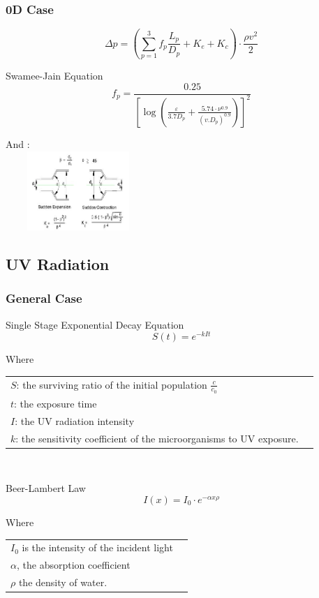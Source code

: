 \documentclass[xcolor=dvipsnames,10pt]{beamer}
\begin{document}
\begin{frame}
\frametitle{0D Case}
	\begin{equation}
		\Delta p = \left(\sum_{p=1}^3 f_p\frac{L_p}{D_p} + K_e + K_c\right)\cdot \frac{\rho v^2}{2}
	\end{equation}
\begin{block}{Swamee-Jain Equation}
\begin{equation}
	f_p = \frac{0.25}{[\log (\frac{\varepsilon}{3.7 D_p} + \frac{5.74\cdot \nu^{0.9}}{(v.D_p)^{0.9}})]^2}
\end{equation}
\end{block}
And : \\
\hspace{20mm}
\includegraphics[height=30mm, width=5.5cm]{./images/fitting.JPG}
\end{frame}





\subsection{UV Radiation}

\begin{frame}
	\frametitle{General Case}
	\begin{block}{Single Stage Exponential Decay Equation}
		\begin{equation}
			S(t)=e^{-kIt}
		\end{equation}
	\end{block}
	Where 
		{\footnotesize 
		\begin{tabular}{ll}
			$S$: the surviving ratio of the initial population $\frac{c}{c_0}$\\
			$t$: the exposure time\\
			$I$: the UV radiation intensity\\
			$k$: the sensitivity coefficient of the microorganisms to UV exposure.
		\end{tabular}
		} \\


	\begin{block}{Beer-Lambert Law}
		\begin{equation}
			I(x) = I_0\cdot e^{-\alpha x\rho}
		\end{equation}
	\end{block}
	Where 
		{\footnotesize 
			\begin{tabular}{ll}
			$I_0$ is the intensity of the incident light\\
			$\alpha$, the absorption coefficient\\
			$\rho$ the density of water.
		\end{tabular}
		}

\end{frame}
\end{document}
